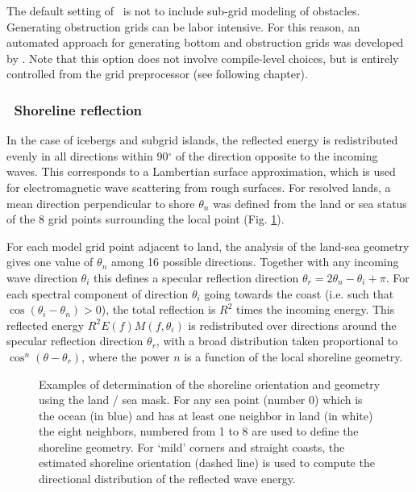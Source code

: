 The default setting of \ws\ is not to include sub-grid modeling of
obstacles. Generating obstruction grids can be labor intensive. For this
reason, an automated approach for generating bottom and obstruction grids was
developed by \cite{tol:MMAB07a, tol:OMOD08a}.  Note that this option does not
involve compile-level choices, but is entirely controlled from the grid
preprocessor (see following chapter).


\vsssub
\subsubsection{~Shoreline reflection} \label{sec_refl}
\vsssub
In the case of  icebergs and subgrid islands, the reflected energy is redistributed evenly in all directions within 90$^\circ$ of the direction opposite to 
the incoming waves. This corresponds to a Lambertian surface approximation, which is used for electromagnetic wave scattering from rough surfaces. 
For resolved lands,  a mean direction perpendicular to shore $\theta_n$ was defined 
from the land or sea status of the 8 grid points surrounding the local point (Fig. \ref{fig:refl}). 

For each model grid point adjacent to land, the analysis of the land-sea geometry gives one value of $\theta_n$  among
16 possible directions. Together with any incoming wave direction $\theta_i$ this defines a specular reflection direction $\theta_r=2 \theta_n - \theta_i + \pi$.  
For each spectral component of direction $\theta_i$ going towards the coast (i.e. such that $\cos(\theta_i-\theta_n) >0$),  the total reflection 
is $R^2$ times the incoming  energy. This reflected energy $R^2 E(f) M(f,\theta_i)$ is redistributed over directions 
around the specular reflection direction $\theta_r$, with a broad distribution taken proportional to $\cos^n(\theta-\theta_r)$, where the power $n$ 
is a function of the local shoreline geometry. 

\begin{figure} \begin{center}
\caption{Examples of determination of the shoreline orientation and geometry using the land / sea mask. For any sea point (number 0) which is the ocean (in blue) 
and has at least one neighbor in land (in white) the eight neighbors, numbered from 1 to 8 are used to define the shoreline geometry. 
For `mild' corners and straight coasts, the estimated shoreline orientation (dashed line) is used to compute the directional distribution of the reflected wave energy.  
}
\label{fig:refl} \botline
\end{center}
\end{figure}

